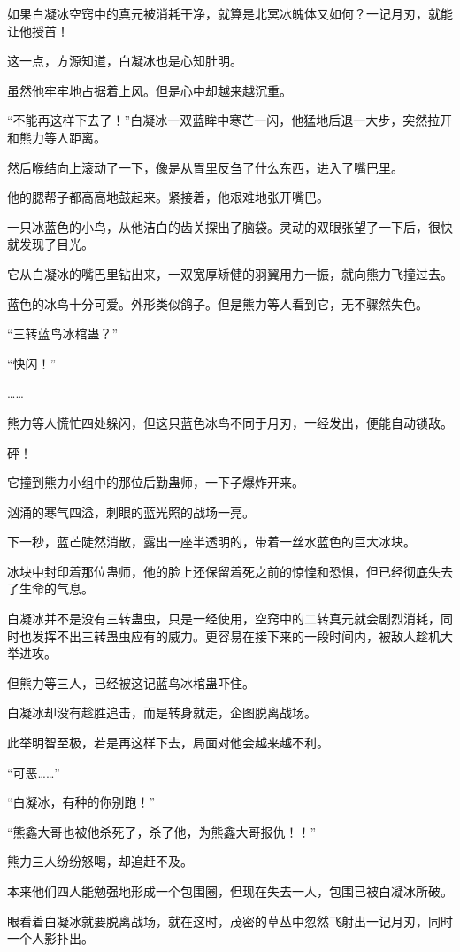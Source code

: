 \begin{this_body}
如果白凝冰空窍中的真元被消耗干净，就算是北冥冰魄体又如何？一记月刃，就能让他授首！

这一点，方源知道，白凝冰也是心知肚明。

虽然他牢牢地占据着上风。但是心中却越来越沉重。

“不能再这样下去了！”白凝冰一双蓝眸中寒芒一闪，他猛地后退一大步，突然拉开和熊力等人距离。

然后喉结向上滚动了一下，像是从胃里反刍了什么东西，进入了嘴巴里。

他的腮帮子都高高地鼓起来。紧接着，他艰难地张开嘴巴。

一只冰蓝色的小鸟，从他洁白的齿关探出了脑袋。灵动的双眼张望了一下后，很快就发现了目光。

它从白凝冰的嘴巴里钻出来，一双宽厚矫健的羽翼用力一振，就向熊力飞撞过去。

蓝色的冰鸟十分可爱。外形类似鸽子。但是熊力等人看到它，无不骤然失色。

“三转蓝鸟冰棺蛊？”

“快闪！”

……

熊力等人慌忙四处躲闪，但这只蓝色冰鸟不同于月刃，一经发出，便能自动锁敌。

砰！

它撞到熊力小组中的那位后勤蛊师，一下子爆炸开来。

汹涌的寒气四溢，刺眼的蓝光照的战场一亮。

下一秒，蓝芒陡然消散，露出一座半透明的，带着一丝水蓝色的巨大冰块。

冰块中封印着那位蛊师，他的脸上还保留着死之前的惊惶和恐惧，但已经彻底失去了生命的气息。

白凝冰并不是没有三转蛊虫，只是一经使用，空窍中的二转真元就会剧烈消耗，同时也发挥不出三转蛊虫应有的威力。更容易在接下来的一段时间内，被敌人趁机大举进攻。

但熊力等三人，已经被这记蓝鸟冰棺蛊吓住。

白凝冰却没有趁胜追击，而是转身就走，企图脱离战场。

此举明智至极，若是再这样下去，局面对他会越来越不利。

“可恶……”

“白凝冰，有种的你别跑！”

“熊鑫大哥也被他杀死了，杀了他，为熊鑫大哥报仇！！”

熊力三人纷纷怒喝，却追赶不及。

本来他们四人能勉强地形成一个包围圈，但现在失去一人，包围已被白凝冰所破。

眼看着白凝冰就要脱离战场，就在这时，茂密的草丛中忽然飞射出一记月刃，同时一个人影扑出。


\end{this_body}
